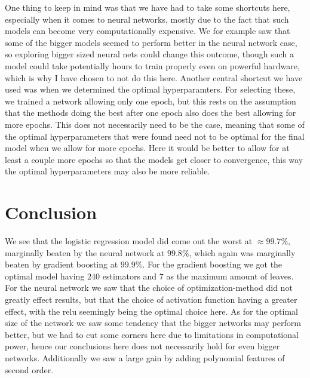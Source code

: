 \documentclass{article}
\begin{document}
One thing to keep in mind was that we have had to take some shortcuts here,
especially when it comes to neural networks, mostly due to the fact that such
models can become very computationally expensive. We for example saw that some
of the bigger models seemed to perform better in the neural network case, so
exploring bigger sized neural nets could change this outcome, though such a
model could take potentially hours to train properly even on powerful hardware,
which is why I have chosen to not do this here. Another central shortcut we have
used was when we determined the optimal hyperparamters.  For selecting these, we
trained a network allowing only one epoch, but this rests on the assumption that
the methods doing the best after one epoch also does the best allowing for more
epochs. This does not necessarily need to be the case, meaning that some of the
optimal hyperparameters that were found need not to be optimal for the final
model when we allow for more epochs. Here it would be better to allow for at
least a couple more epochs so that the models get closer to convergence, this
way the optimal hyperparameters may also be more reliable.

\section{Conclusion}
We see that the logistic regression model did come out the worst at $\approx
	99.7\%$, marginally beaten by the neural network at $99.8\%$, which again was
marginally beaten by gradient boosting at $99.9\%$. For the gradient boosting we
got the optimal model having $240$ estimators and $7$ as the maximum amount of
leaves.  For the neural network we saw that the choice of optimization-method
did not greatly effect results, but that the choice of activation function
having a greater effect, with the relu seemingly being the optimal choice here.
As for the optimal size of the network we saw some tendency that the bigger
networks may perform better, but we had to cut some corners here due to
limitations in computational power, hence our conclusions here does not
necessarily hold for even bigger networks. Additionally we saw a large gain by
adding polynomial features of second order.
\end{document}
